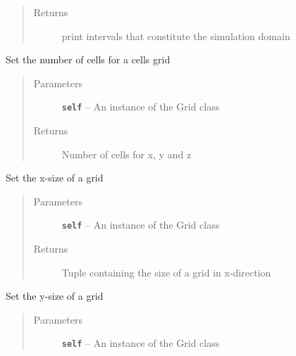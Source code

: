 \documentclass[letterpaper,10pt,english]{sphinxmanual}
\begin{document}
\begin{fulllineitems}
\begin{fulllineitems}
\begin{quote}
\begin{description}
\item[{Returns}] \leavevmode
print intervals that constitute the simulation domain

\end{description}\end{quote}

\end{fulllineitems}


\begin{fulllineitems}
\label{hyvr:hyvr.hyvr.grid.Grid.set_cells}
Set the number of cells for a cells grid
\begin{quote}\begin{description}
\item[{Parameters}] \leavevmode
\textbf{\texttt{self}} -- An instance of the Grid class

\item[{Returns}] \leavevmode
Number of cells for x, y and z

\end{description}\end{quote}

\end{fulllineitems}


\begin{fulllineitems}
\label{hyvr:hyvr.hyvr.grid.Grid.set_lx}
Set the x-size of a grid
\begin{quote}\begin{description}
\item[{Parameters}] \leavevmode
\textbf{\texttt{self}} -- An instance of the Grid class

\item[{Returns}] \leavevmode
Tuple containing the size of a grid in x-direction

\end{description}\end{quote}

\end{fulllineitems}


\begin{fulllineitems}
\label{hyvr:hyvr.hyvr.grid.Grid.set_ly}
Set the y-size of a grid
\begin{quote}\begin{description}
\item[{Parameters}] \leavevmode
\textbf{\texttt{self}} -- An instance of the Grid class


\end{description}
\end{quote}
\end{fulllineitems}
\end{fulllineitems}
\end{document}
